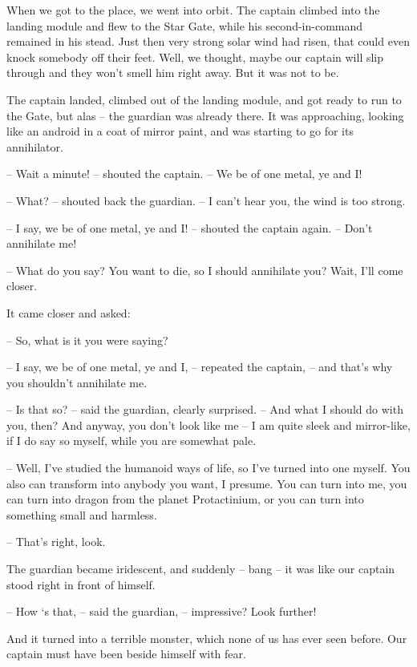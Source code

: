 \documentclass[ebook,twoside,final,openright]{memoir}
\begin{document}
\par
When we got to the place, we went into orbit. The captain climbed into the landing module and flew to the Star Gate, while his second-in-command remained in his stead. Just then very strong solar wind had risen, that could even knock somebody off their feet. Well, we thought, maybe our captain will slip through and they won’t smell him right away. But it was not to be.\par
\par
The captain landed, climbed out of the landing module, and got ready to run to the Gate, but alas – the guardian was already there. It was approaching, looking like an android in a coat of mirror paint, and was starting to go for its annihilator.\par
– Wait a minute! – shouted the captain. – We be of one metal, ye and I!\par
– What? – shouted back the guardian. – I can’t hear you, the wind is too strong.\par
– I say, we be of one metal, ye and I! – shouted the captain again. – Don’t annihilate me!\par
– What do you say? You want to die, so I should annihilate you? Wait, I'll come closer.\par
\par
It came closer and asked:\par
– So, what is it you were saying?\par
– I say, we be of one metal, ye and I, – repeated the captain, – and that’s why you shouldn’t annihilate me.\par
– Is that so? – said the guardian, clearly surprised. – And what I should do with you, then? And anyway, you don’t look like me – I am quite sleek and mirror-like, if I do say so myself, while you are somewhat pale.\par
– Well, I've studied the humanoid ways of life, so I’ve turned into one myself. You also can transform into anybody you want, I presume. You can turn into me, you can turn into dragon from the planet Protactinium, or you can turn into something small and harmless.\par
– That's right, look.\par
\par
The guardian became iridescent, and suddenly – bang – it was like our captain stood right in front of himself.\par
– How ‘s that, – said the guardian, – impressive? Look further!\par
And it turned into a terrible monster, which none of us has ever seen before. Our captain must have been beside himself with fear.\par
\end{document}
